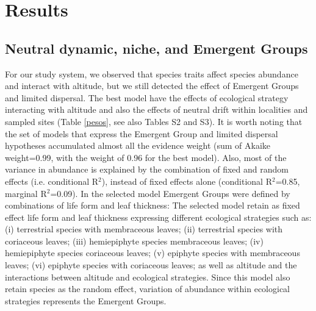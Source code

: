 \documentclass[12pt]{article}
\begin{document}
\section*{Results}

\subsection*{Neutral dynamic, niche, and Emergent Groups}

For our study system, we observed that species traits affect species abundance and interact with altitude, but
we still detected the effect of Emergent Groups and limited dispersal.
The best model have the effects of ecological strategy interacting with altitude and also the effects of
neutral drift within localities and sampled sites 
(Table \ref{pesos}, see also Tables S2 and S3).
It is worth noting that the set of models that express the Emergent Group and limited dispersal hypotheses accumulated almost all the evidence weight (sum of Akaike weight=0.99, with the weight of 0.96 for the best model). Also, most of the variance in abundance is explained by the combination of fixed and random effects (i.e. conditional R${^2}$), instead of fixed effects alone (conditional R${^2}$=0.85, marginal R${^2}$=0.09).  
In the selected model Emergent Groups were defined by combinations of
life form and leaf thickness:  
The selected model retain  as fixed effect life form and leaf thickness expressing different ecological strategies such as:
(i) terrestrial species with membraceous leaves; 
(ii) terrestrial species with coriaceous leaves;
(iii) hemiepiphyte species membraceous leaves;
(iv) hemiepiphyte species coriaceous leaves;
(v) epiphyte species with membraceous leaves;
(vi) epiphyte species with coriaceous leaves; as well as altitude and the interactions between altitude and ecological strategies. Since this model also retain species as the random effect, variation of abundance within ecological strategies represents the Emergent Groups. 
\end{document}
